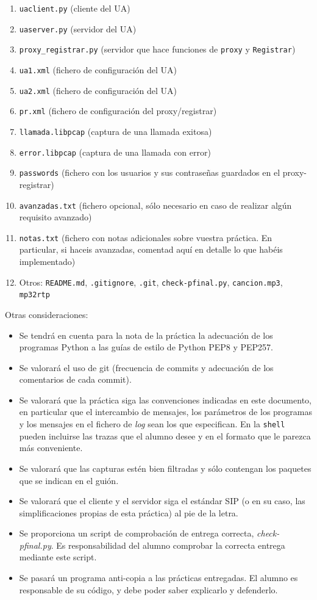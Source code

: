 \documentclass[a4paper,11pt]{article}
\begin{document}
\begin{enumerate}
  \item \texttt{uaclient.py} (cliente del UA)
  \item \texttt{uaserver.py} (servidor del UA)
  \item \texttt{proxy\_registrar.py} (servidor que hace funciones de \texttt{proxy} y \texttt{Registrar})
  \item \texttt{ua1.xml} (fichero de configuración del UA)
  \item \texttt{ua2.xml} (fichero de configuración del UA)
  \item \texttt{pr.xml} (fichero de configuración del proxy/registrar)
  \item \texttt{llamada.libpcap} (captura de una llamada exitosa)
  \item \texttt{error.libpcap} (captura de una llamada con error)
  \item \texttt{passwords} (fichero con los usuarios y sus contraseñas guardados en el proxy-registrar)
  \item \texttt{avanzadas.txt} (fichero opcional, sólo necesario en caso de realizar algún requisito avanzado)
  \item \texttt{notas.txt} (fichero con notas adicionales sobre vuestra práctica. En particular, si haceis avanzadas, comentad aquí en detalle lo que habéis implementado)
  \item Otros: \texttt{README.md}, \texttt{.gitignore}, \texttt{.git}, \texttt{check-pfinal.py}, \texttt{cancion.mp3}, \texttt{mp32rtp}
\end{enumerate}

Otras consideraciones:
\begin{itemize}
  \item Se tendrá en cuenta para la nota de la práctica la adecuación de los
programas Python a las guías de estilo de Python PEP8 y PEP257.
  \item Se valorará el uso de git (frecuencia de commits y adecuación de los comentarios de cada commit).
  \item Se valorará que la práctica siga las convenciones indicadas en este documento, en particular que el intercambio de mensajes, los parámetros de los programas y los mensajes en el fichero de \emph{log} sean los que especifican. En la \texttt{shell} pueden incluirse las trazas que el alumno desee y en el formato que le parezca más conveniente.
  \item Se valorará que las capturas estén bien filtradas y sólo contengan los paquetes que se indican en el guión.
  \item Se valorará que el cliente y el servidor siga el estándar SIP (o en su caso, las simplificaciones propias de esta práctica) al pie de la letra.
  \item Se proporciona un script de comprobación de entrega correcta, \emph{check-pfinal.py}. Es responsabilidad del alumno comprobar la correcta entrega mediante este script.

  \item Se pasará un programa anti-copia a las prácticas entregadas. El alumno es responsable de su código, y debe poder saber explicarlo y defenderlo.
\end{itemize}
\end{document}
